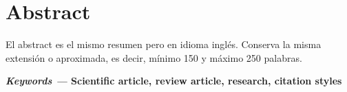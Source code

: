 \newpage

\section*{Abstract}
%

\noindent El abstract es el mismo resumen pero en idioma inglés. Conserva la misma extensión o aproximada, es decir, mínimo 150 y máximo 250 palabras.


\vspace{1cm}\textbf{\textit{Keywords ---} Scientific article, review article, research, citation styles}


\newpage


